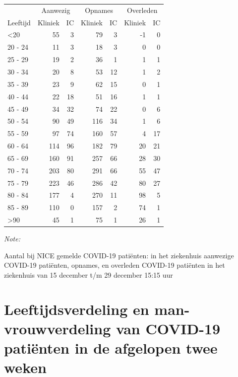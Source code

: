 \documentclass[
  english,
  man,floatsintext]{apa6}
\begin{document}
\begin{table}
\centering\begingroup\fontsize{10}{12}\selectfont

\begin{threeparttable}
\begin{tabular}{lrrrrrr}
\toprule
\multicolumn{1}{c}{ } & \multicolumn{2}{c}{Aanwezig} & \multicolumn{2}{c}{Opnames} & \multicolumn{2}{c}{Overleden} \\
\cmidrule(l{3pt}r{3pt}){2-3} \cmidrule(l{3pt}r{3pt}){4-5} \cmidrule(l{3pt}r{3pt}){6-7}
Leeftijd & Kliniek & IC & Kliniek & IC & Kliniek & IC\\
\midrule
<20 & 55 & 3 & 79 & 3 & -1 & 0\\
20 - 24 & 11 & 3 & 18 & 3 & 0 & 0\\
25 - 29 & 19 & 2 & 36 & 1 & 1 & 1\\
30 - 34 & 20 & 8 & 53 & 12 & 1 & 2\\
35 - 39 & 23 & 9 & 62 & 15 & 0 & 1\\
40 - 44 & 22 & 18 & 51 & 16 & 1 & 1\\
45 - 49 & 34 & 32 & 74 & 22 & 0 & 6\\
50 - 54 & 90 & 49 & 116 & 34 & 1 & 6\\
55 - 59 & 97 & 74 & 160 & 57 & 4 & 17\\
60 - 64 & 114 & 96 & 182 & 79 & 20 & 21\\
65 - 69 & 160 & 91 & 257 & 66 & 28 & 30\\
70 - 74 & 203 & 80 & 291 & 66 & 55 & 47\\
75 - 79 & 223 & 46 & 286 & 42 & 80 & 27\\
80 - 84 & 177 & 4 & 270 & 11 & 98 & 5\\
85 - 89 & 110 & 0 & 157 & 2 & 74 & 1\\
>90 & 45 & 1 & 75 & 1 & 26 & 1\\
\bottomrule
\end{tabular}
\begin{tablenotes}
\item \textit{Note: } 
\item Aantal bij NICE gemelde COVID-19 patiënten: in het ziekenhuis aanwezige COVID-19 patiënten, opnames, en overleden COVID-19 patiënten in het ziekenhuis van 15 december t/m 29 december 15:15 uur
\end{tablenotes}
\end{threeparttable}
\endgroup{}
\end{table}

\newpage

\hypertarget{leeftijdsverdeling-en-man-vrouwverdeling-van-covid-19-patiuxebnten-in-de-afgelopen-twee-weken}{%
\section{Leeftijdsverdeling en man-vrouwverdeling van COVID-19 patiënten in de afgelopen twee weken}\label{leeftijdsverdeling-en-man-vrouwverdeling-van-covid-19-patiuxebnten-in-de-afgelopen-twee-weken}}
\end{document}
